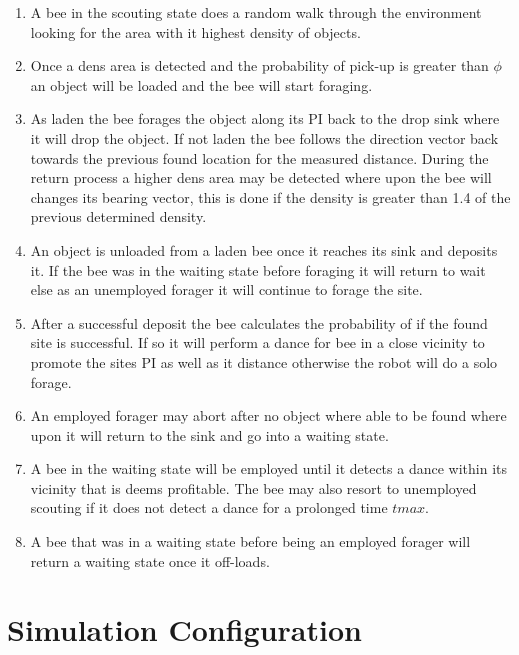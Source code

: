 \documentclass[12pt]{article}
\begin{document}
\begin{enumerate}
	\item A bee in the scouting state does a random walk through the environment looking for the area with it highest density of objects.
	\item Once a dens area is detected and the probability  of pick-up is greater than $\phi$ an object will be loaded and the bee will start foraging.
	\item As laden the bee forages the object along its PI back to the drop sink where it will drop the object. If not laden the bee follows the direction vector back towards the previous found location for the measured distance. During the return process a higher dens area may be detected where upon the bee will changes its bearing vector, this is done if the density is greater than 1.4 of the previous determined density.
	\item An object is unloaded from a laden bee once it reaches its sink and deposits it. If the bee was in the waiting state before foraging it will return to wait else as an unemployed forager it will continue to forage the site.
	\item After a successful deposit the bee calculates the probability of if the found site is successful. If so it will perform a dance for bee in a close vicinity to promote the sites PI as well as it distance otherwise the robot will do a solo forage.
	\item An employed forager may abort after no object where able to be found where upon it will return to the sink and go into a waiting state.
	\item A bee in the waiting state will be employed until it detects a dance within its vicinity that is deems profitable.  The bee may also resort to unemployed scouting if it does not detect a dance for a prolonged time $tmax$.
	\item A bee that was in a waiting state before being an employed forager will return a waiting state once it off-loads.
\end{enumerate}

\section{Simulation Configuration}
\end{document}
